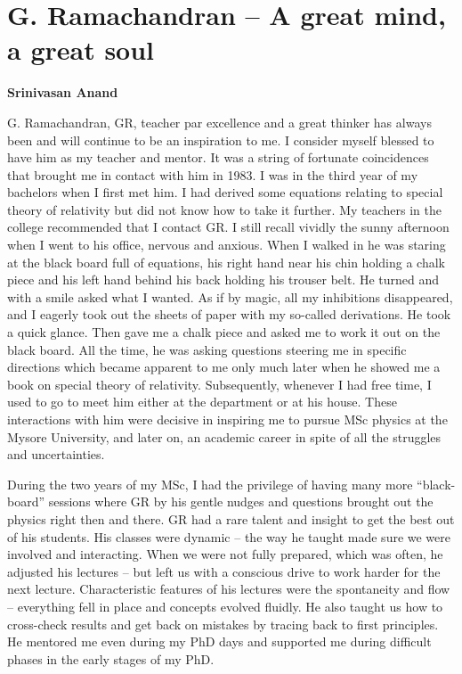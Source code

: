 \chapter{G. Ramachandran – A great mind, a great soul}

\begin{center}
\textbf{Srinivasan Anand}
\end{center}

\medskip
G. Ramachandran, GR, teacher par excellence and a great thinker has always been and will continue to be an inspiration to me. I consider myself blessed to have him as my teacher and mentor. It was a string of fortunate coincidences that brought me in contact with him in 1983. I was in the third year of my bachelors when I first met him. I had derived some equations relating to special theory of relativity but did not know how to take it further. My teachers in the college recommended that I contact GR.  I still recall vividly the sunny afternoon when I went to his office, nervous and anxious.  When I walked in he was staring at the black board full of equations, his right hand near his chin holding a chalk piece and his left hand behind his back holding his trouser belt. He turned and with a smile asked what I wanted. As if by magic, all my inhibitions disappeared, and I eagerly took out the sheets of paper with my so-called derivations. He took a quick glance. Then gave me a chalk piece and asked me to work it out on the black board.  All the time, he was asking questions steering me in specific directions which became apparent to me only much later when he showed me a book on special theory of relativity. Subsequently, whenever I had free time, I used to go to meet him either at the department or at his house. These interactions with him were decisive in inspiring me to pursue MSc physics at the Mysore University, and later on, an academic career in spite of all the struggles and uncertainties. 

\newpage

During the two years of my MSc, I had the privilege of having many more “black-board” sessions where GR by his gentle nudges and questions brought out the physics right then and there. GR had a rare talent and insight to get the best out of his students.  His classes were dynamic – the way he taught made sure we were involved and interacting. When we were not fully prepared, which was often, he adjusted his lectures – but left us with a conscious drive to work harder for the next lecture. Characteristic features of his lectures were the spontaneity and flow – everything fell in place and concepts evolved fluidly. He also taught us how to cross-check results and get back on mistakes by tracing back to first principles. He mentored me even during my PhD days and supported me during difficult phases in the early stages of my PhD.

